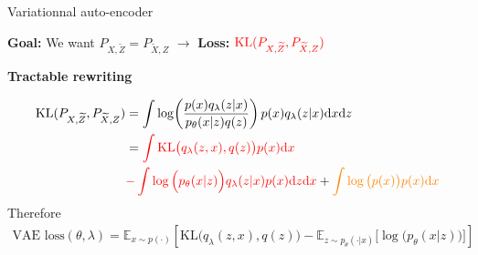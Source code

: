 \documentclass[english]{beamer}
\newcommand{\EE}{\mathbb{E}}
\newcommand{\KL}{\mathrm{KL}}
\renewcommand{\d}{\mathrm{d}}
\newcommand{\tX}{\widetilde{X}}
\newcommand{\tZ}{\widetilde{Z}}
\begin{document}
\begin{frame}{Variationnal auto-encoder}

\textbf{Goal:} We want $P_{X, \tZ} = P_{\tX, Z}$ $\to$ \textbf{Loss: } $\textcolor{red}{\KL(P_{X,\tZ},P_{\tX,Z})}$ 

\vspace{1em}
\textbf{Tractable rewriting}

\begin{align*}
    \KL(P_{X,\tZ},P_{\tX,Z}) &= \int \log\!\left(\frac{p(x)q_\lambda(z|x)}{p_\theta(x|z)q(z)}\right)p(x)q_\lambda(z|x)\d x\d z\\
    &= \textcolor{red}{\int \KL\big(q_\lambda(z,x),q(z)\big)p(x)\d x}\\
    &\textcolor{red}{- \int\log\Big(p_\theta(x|z)\Big)q_\lambda(z|x)p(x)\d z\d x} +\textcolor{orange}{\int\log\big(p(x)\big)p(x) \d x}
\end{align*}
Therefore 
\begin{align*}
    \text{VAE loss}(\theta,\lambda) = \EE_{x\sim p(\cdot)}\left[ \KL\big(q_\lambda(z,x),q(z)\big) - \EE_{z\sim p_\theta(\cdot|x)}\big[\log\!\big(p_\theta(x|z)\big)\big] \right]
\end{align*}
\end{frame}
\end{document}
